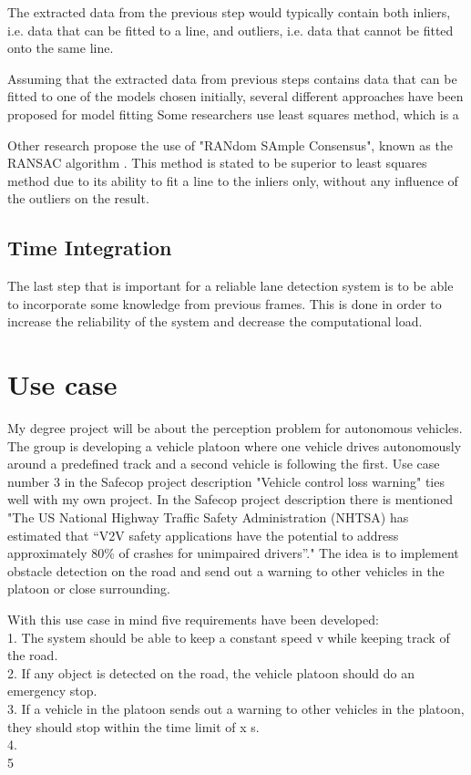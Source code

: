 The extracted data from the previous step would typically contain both inliers, i.e. data that can be fitted to a line, and outliers, i.e. data that cannot be fitted onto the same line. \cite{raguram2008comparative}

Assuming that the extracted data from previous steps contains data that can be fitted to one of the models chosen initially, several different approaches have been proposed for model fitting \cite{BarHillel2014} 
Some researchers use least squares method, which is a 

Other research propose the use of "RANdom SAmple Consensus", known as the RANSAC algorithm \cite{huang2009finding}\cite{aly2008real} \cite{li2013lane}. This method is stated to be superior to least squares method due to its ability to fit a line to the inliers only, without any influence of the outliers on the result.  


\subsection{Time Integration}
The last step that is important for a reliable lane detection system is to be able to incorporate some knowledge from previous frames. This is done in order to increase the reliability of the system and decrease the computational load.


\section{Use case}
My degree project will be about the perception problem for autonomous vehicles. The group is developing a vehicle platoon where one vehicle drives autonomously around a predefined track and a second vehicle is following the first. Use case number 3 in the Safecop project description "Vehicle control loss warning" ties well with my own project. In the Safecop project description there is mentioned "The US National Highway Traffic Safety Administration (NHTSA) has estimated that “V2V safety
applications have the potential to address approximately 80\% of crashes for unimpaired drivers”." The idea is to implement obstacle detection on the road and send out a warning to other vehicles in the platoon or close surrounding.

With this use case in mind five requirements have been developed:\\

1. The system should be able to keep a constant speed v while keeping track of the road.\\
2. If any object is detected on the road, the vehicle platoon should do an emergency stop.\\
3. If a vehicle in the platoon sends out a warning to other vehicles in the platoon, they should stop within the time limit of x s. \\
4. \\
5\\